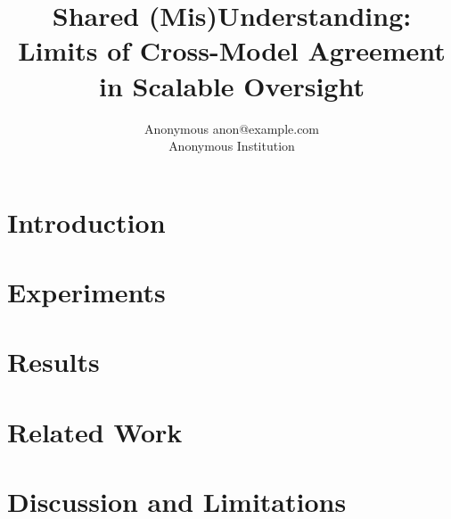 \documentclass[10pt]{article}
\title{Shared (Mis)Understanding:\\Limits of Cross-Model Agreement in Scalable Oversight}
\author{\name Anonymous \email anon@example.com \\
      \addr Anonymous Institution}
\theoremstyle{remark}
\begin{document}
\maketitle



\section{Introduction}
\label{sec:intro}




\section{Experiments}
\label{sec:experiments}

\section{Results}
\label{sec:results}

\section{Related Work}
\label{sec:related}

\section{Discussion and Limitations}
\label{sec:discussion}



\end{document}
